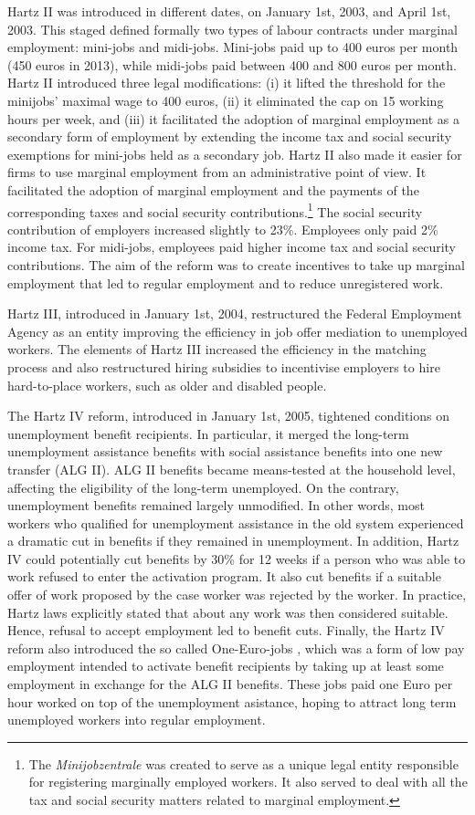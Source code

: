 \documentclass[12pt, a4paper]{article}
\begin{document}
Hartz II was introduced in different dates, on January 1st, 2003, and April 1st, 2003. This staged defined formally two types of labour contracts under marginal employment: mini-jobs and midi-jobs. Mini-jobs paid up to 400 euros per month (450 euros in 2013), while midi-jobs paid between 400 and 800 euros per month. Hartz II introduced three legal modifications: (i) it lifted the threshold for the minijobs' maximal wage to 400 euros, (ii) it eliminated the cap on 15 working hours per week, and (iii) it facilitated the adoption of marginal employment as a secondary form of employment by extending the income tax and social security exemptions for mini-jobs held as a secondary job. Hartz II also made it easier for firms to use marginal employment from an administrative point of view. It facilitated the adoption of marginal employment and the payments of the corresponding taxes and social security contributions.\footnote{The \emph{Minijobzentrale} was created to serve as a unique legal entity responsible for registering marginally employed workers. It also served to deal with all the tax and social security matters related to marginal employment.} The social security contribution of employers increased slightly to 23\%. Employees only paid 2\% income tax. For midi-jobs, employees paid higher income tax and social security contributions. The aim of the reform was to create incentives to take up marginal employment that led to regular employment and to reduce unregistered work. 

Hartz III, introduced in January 1st, 2004, restructured the Federal Employment Agency as an entity improving the efficiency in job offer mediation to unemployed workers. The elements of Hartz III increased the efficiency in the matching process and also restructured hiring subsidies to incentivise employers to hire hard-to-place workers, such as older and disabled people.

The Hartz IV reform, introduced in January 1st, 2005, tightened conditions on unemployment benefit recipients. In particular, it merged the long-term unemployment assistance benefits with social assistance benefits into one new transfer (ALG II). ALG II benefits became means-tested at the household level, affecting the eligibility of the long-term unemployed. On the contrary, unemployment benefits remained largely unmodified. In other words, most workers who qualified for unemployment assistance in the old system experienced a dramatic cut in benefits if they remained in unemployment. In addition, Hartz IV could potentially cut benefits by 30\% for 12 weeks if a person who was able to work refused to enter the activation program. It also cut benefits if a suitable offer of work proposed by the case worker was rejected by the worker. In practice, Hartz laws explicitly stated that about any work was then considered suitable. Hence, refusal to accept employment led to benefit cuts. Finally, the Hartz IV reform also introduced the so called One-Euro-jobs , which was a form of low pay employment intended to activate benefit recipients by taking up at least some employment in exchange for the ALG II benefits. These jobs paid one Euro per hour worked on top of the unemployment asistance, hoping to attract long term unemployed workers into regular employment.
\end{document}
